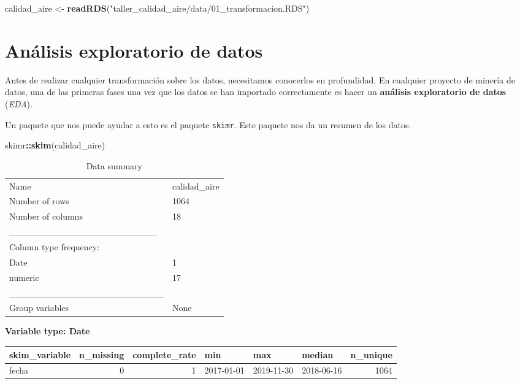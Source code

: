 \documentclass[]{article}
\newenvironment{Shaded}{\begin{snugshade}}{\end{snugshade}}
\newcommand{\KeywordTok}[1]{\textcolor[rgb]{0.13,0.29,0.53}{\textbf{#1}}}
\newcommand{\NormalTok}[1]{#1}
\newcommand{\OperatorTok}[1]{\textcolor[rgb]{0.81,0.36,0.00}{\textbf{#1}}}
\newcommand{\StringTok}[1]{\textcolor[rgb]{0.31,0.60,0.02}{#1}}
\begin{document}
\begin{Shaded}
\begin{Highlighting}[]
\NormalTok{calidad_aire <-}\StringTok{ }\KeywordTok{readRDS}\NormalTok{(}\StringTok{"taller_calidad_aire/data/01_transformacion.RDS"}\NormalTok{)}
\end{Highlighting}
\end{Shaded}

\hypertarget{anuxe1lisis-exploratorio-de-datos}{%
\section{Análisis exploratorio de
datos}\label{anuxe1lisis-exploratorio-de-datos}}

Antes de realizar cualquier transformación sobre los datos, necesitamos
conocerlos en profundidad. En cualquier proyecto de minería de datos,
una de las primeras fases una vez que los datos se han importado
correctamente es hacer un \textbf{análisis exploratorio de datos}
(\emph{EDA}).

Un paquete que nos puede ayudar a esto es el paquete \texttt{skimr}.
Este paquete nos da un resumen de los datos.

\begin{Shaded}
\begin{Highlighting}[]
\NormalTok{skimr}\OperatorTok{::}\KeywordTok{skim}\NormalTok{(calidad_aire)}
\end{Highlighting}
\end{Shaded}

\begin{longtable}[]{@{}ll@{}}
\caption{Data summary}\tabularnewline
\toprule
\endhead
Name & calidad\_aire\tabularnewline
Number of rows & 1064\tabularnewline
Number of columns & 18\tabularnewline
\_\_\_\_\_\_\_\_\_\_\_\_\_\_\_\_\_\_\_\_\_\_\_ &\tabularnewline
Column type frequency: &\tabularnewline
Date & 1\tabularnewline
numeric & 17\tabularnewline
\_\_\_\_\_\_\_\_\_\_\_\_\_\_\_\_\_\_\_\_\_\_\_\_ &\tabularnewline
Group variables & None\tabularnewline
\bottomrule
\end{longtable}

\textbf{Variable type: Date}

\begin{longtable}[]{@{}lrrlllr@{}}
\toprule
skim\_variable & n\_missing & complete\_rate & min & max & median &
n\_unique\tabularnewline
\midrule
\endhead
fecha & 0 & 1 & 2017-01-01 & 2019-11-30 & 2018-06-16 &
1064\tabularnewline
\bottomrule
\end{longtable}
\end{document}
